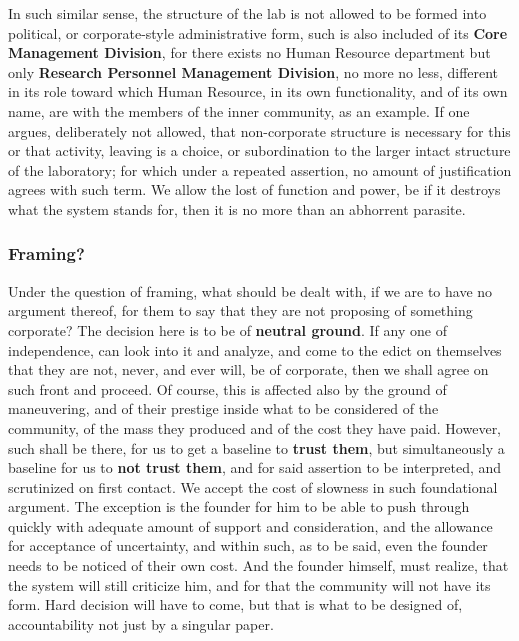 \documentclass[10pt,a4paper]{article}
\begin{document}
In such similar sense, the structure of the lab is not allowed to be formed into political, or corporate-style administrative form, such is also included of its \textbf{Core Management Division}, for there exists no Human Resource department but only \textbf{Research Personnel Management Division}, no more no less, different in its role toward which Human Resource, in its own functionality, and of its own name, are with the members of the inner community, as an example. If one argues, deliberately not allowed, that non-corporate structure is necessary for this or that activity, leaving is a choice, or subordination to the larger intact structure of the laboratory; for which under a repeated assertion, no amount of justification agrees with such term. We allow the lost of function and power, be if it destroys what the system stands for, then it is no more than an abhorrent parasite.  

\subsubsection{Framing?}

Under the question of framing, what should be dealt with, if we are to have no argument thereof, for them to say that they are not proposing of something corporate? The decision here is to be of \textbf{neutral ground}. If any one of independence, can look into it and analyze, and come to the edict on themselves that they are not, never, and ever will, be of corporate, then we shall agree on such front and proceed. Of course, this is affected also by the ground of maneuvering, and of their prestige inside what to be considered of the community, of the mass they produced and of the cost they have paid. However, such shall be there, for us to get a baseline to \textbf{trust them}, but simultaneously a baseline for us to \textbf{not trust them}, and for said assertion to be interpreted, and scrutinized on first contact. We accept the cost of slowness in such foundational argument. The exception is the founder for him to be able to push through quickly with adequate amount of support and consideration, and the allowance for acceptance of uncertainty, and within such, as to be said, even the founder needs to be noticed of their own cost. And the founder himself, must realize, that the system will still criticize him, and for that the community will not have its form. Hard decision will have to come, but that is what to be designed of, accountability not just by a singular paper. 
\end{document}

